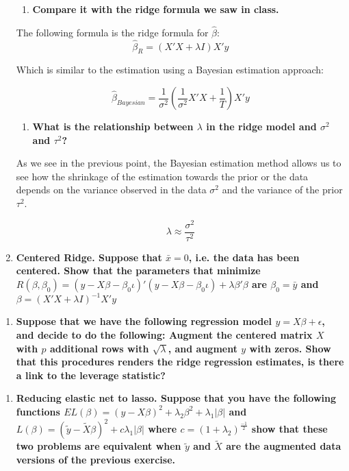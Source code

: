 \documentclass[12pt,onecolumn]{article}
\begin{document}
\begin{enumerate}
  \begin{enumerate}[resume]   
      \item \bf{Compare it with the ridge formula we saw in class.} 
  \end{enumerate}

  The following formula is the ridge formula for $\hat{\beta}$:
  \begin{equation*}
      \hat{\beta}_R=(X'X+\lambda{I})X'y
  \end{equation*}

  Which is similar to the estimation using a Bayesian estimation approach:

  \begin{equation*}
      \hat{\beta}_{Bayesian}=\frac{1}{\sigma^2}\left(\frac{1}{\sigma^2}X'X+\frac{1}{T}\right)X'y
  \end{equation*}

  \begin{enumerate}[resume]    
      \item \bf{What is the relationship between $\lambda$ in the ridge model and $\sigma^2$ and $\tau^2$?}
  \end{enumerate}
  
  As we see in the previous point, the Bayesian estimation method allows us to see how the shrinkage of the estimation towards the prior or the data depends on the variance observed in the data $\sigma^2$ and the variance of the prior $\tau^2$.

  \begin{equation*}
      \lambda\approx\frac{\sigma^2}{\tau^2}
  \end{equation*}

    \item \bf{Centered Ridge. Suppose that $\bar x= 0$, i.e. the data has been centered. Show that the parameters that minimize $R(\beta,\beta_0) = (y-X\beta-\beta_0 \iota)'(y-X\beta-\beta_0 \iota)+ \lambda\beta'\beta$ are $\beta_0=\bar y$ and $\beta=(X'X+\lambda I)^{-1}X'y$}
\end{enumerate}
\begin{enumerate}[resume]  
    \item \bf{Suppose that we have the following regression model  $y=X\beta +\epsilon$, and decide to do the following: Augment the centered matrix $X$ with $p$ additional rows with $\sqrt{\lambda}$, and augment $y$ with zeros. Show that this procedures renders the ridge regression estimates, is there a link to the leverage statistic?}
\end{enumerate}
\begin{enumerate}[resume]    
    \item \bf{Reducing elastic net to lasso. Suppose that you have the following functions $EL(\beta) = (y-X\beta)^2+ \lambda_2 \beta^2+ \lambda_1|\beta|$ and $L(\beta) = (\tilde{y}-\tilde{X}\beta)^2+ c \lambda_1|\beta|$ where $c=(1+\lambda_2)^{\frac{-1}{2}}$ show that these two problems are equivalent when $\tilde{y}$ and $\tilde{X}$ are the augmented data versions of the previous exercise.}
\end{enumerate}
\end{document}
